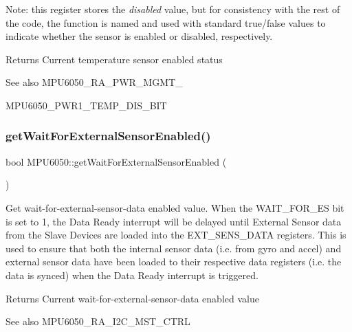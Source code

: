 Note\+: this register stores the {\itshape disabled} value, but for consistency with the rest of the code, the function is named and used with standard true/false values to indicate whether the sensor is enabled or disabled, respectively.

\begin{DoxyReturn}{Returns}
Current temperature sensor enabled status 
\end{DoxyReturn}
\begin{DoxySeeAlso}{See also}
M\+P\+U6050\+\_\+\+R\+A\+\_\+\+P\+W\+R\+\_\+\+M\+G\+M\+T\+\_ 

M\+P\+U6050\+\_\+\+P\+W\+R1\+\_\+\+T\+E\+M\+P\+\_\+\+D\+I\+S\+\_\+\+B\+IT 
\end{DoxySeeAlso}
\mbox{\label{class_m_p_u6050_a4e2ebda47b85b4c5463f041c790bf5c0}} 
\subsubsection{\texorpdfstring{getWaitForExternalSensorEnabled()}{getWaitForExternalSensorEnabled()}}
{\footnotesize\ttfamily bool M\+P\+U6050\+::get\+Wait\+For\+External\+Sensor\+Enabled (\begin{DoxyParamCaption}{ }\end{DoxyParamCaption})}

Get wait-\/for-\/external-\/sensor-\/data enabled value. When the W\+A\+I\+T\+\_\+\+F\+O\+R\+\_\+\+ES bit is set to 1, the Data Ready interrupt will be delayed until External Sensor data from the Slave Devices are loaded into the E\+X\+T\+\_\+\+S\+E\+N\+S\+\_\+\+D\+A\+TA registers. This is used to ensure that both the internal sensor data (i.\+e. from gyro and accel) and external sensor data have been loaded to their respective data registers (i.\+e. the data is synced) when the Data Ready interrupt is triggered.

\begin{DoxyReturn}{Returns}
Current wait-\/for-\/external-\/sensor-\/data enabled value 
\end{DoxyReturn}
\begin{DoxySeeAlso}{See also}
M\+P\+U6050\+\_\+\+R\+A\+\_\+\+I2\+C\+\_\+\+M\+S\+T\+\_\+\+C\+T\+RL 
\end{DoxySeeAlso}
\mbox{\label{class_m_p_u6050_a89afc5235b9088c696e2cc7841f5259a}} 
